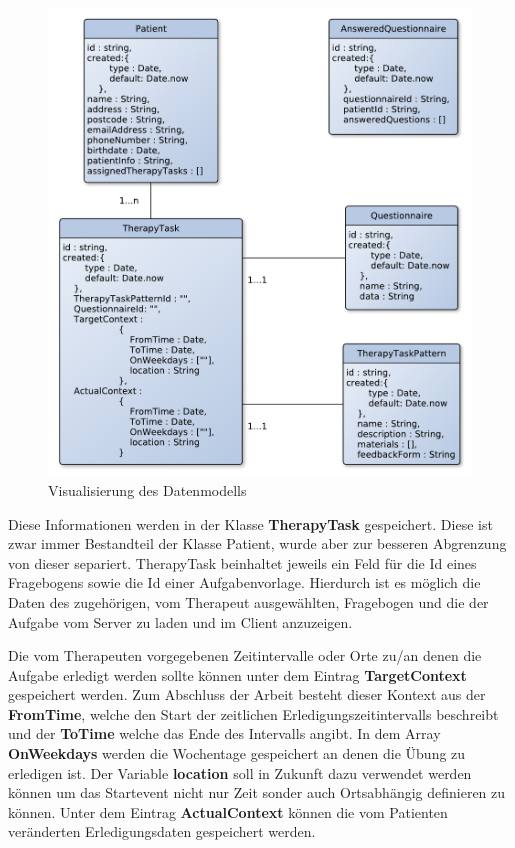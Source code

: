 \begin{figure}[H]
	\centering
	\includegraphics[scale=0.7]{images/datenModell}
	\caption[Visualisierung des Datenmodells]{Visualisierung des Datenmodells}
	\label{Datenmodell}
\end{figure}

Diese Informationen werden in der Klasse \textbf{TherapyTask} gespeichert. Diese ist zwar immer Bestandteil der Klasse Patient, wurde aber zur besseren Abgrenzung von dieser separiert.
TherapyTask beinhaltet jeweils ein Feld für die Id eines Fragebogens sowie die Id einer Aufgabenvorlage. Hierdurch ist es möglich die Daten des zugehörigen, vom Therapeut ausgewählten, Fragebogen und die der Aufgabe vom Server zu laden und im Client anzuzeigen.

Die vom Therapeuten vorgegebenen Zeitintervalle oder Orte zu/an denen die Aufgabe erledigt werden sollte können unter dem Eintrag \textbf{TargetContext} gespeichert werden. Zum Abschluss der Arbeit besteht dieser Kontext aus der \textbf{FromTime}, welche den Start der zeitlichen Erledigungszeitintervalls beschreibt und der \textbf{ToTime} welche das Ende des Intervalls angibt. In dem Array \textbf{OnWeekdays} werden die Wochentage gespeichert an denen die Übung zu erledigen ist. Der Variable \textbf{location} soll in Zukunft dazu verwendet werden können um das Startevent nicht nur Zeit sonder auch Ortsabhängig definieren zu können.
Unter dem Eintrag \textbf{ActualContext} können die vom Patienten veränderten Erledigungsdaten gespeichert werden.


